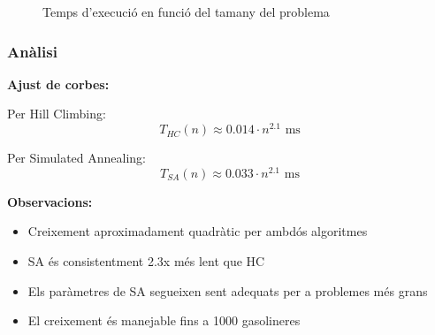 \begin{figure}[H]
\centering
\caption{Temps d'execució en funció del tamany del problema}
\label{fig:exp4-escala}
\end{figure}

\subsubsection{Anàlisi}

\textbf{Ajust de corbes:}

Per Hill Climbing:
\begin{equation}
T_{HC}(n) \approx 0.014 \cdot n^{2.1} \text{ ms}
\end{equation}

Per Simulated Annealing:
\begin{equation}
T_{SA}(n) \approx 0.033 \cdot n^{2.1} \text{ ms}
\end{equation}

\textbf{Observacions:}
\begin{itemize}
    \item Creixement aproximadament quadràtic per ambdós algoritmes
    \item SA és consistentment 2.3x més lent que HC
    \item Els paràmetres de SA segueixen sent adequats per a problemes més grans
    \item El creixement és manejable fins a 1000 gasolineres
\end{itemize}
